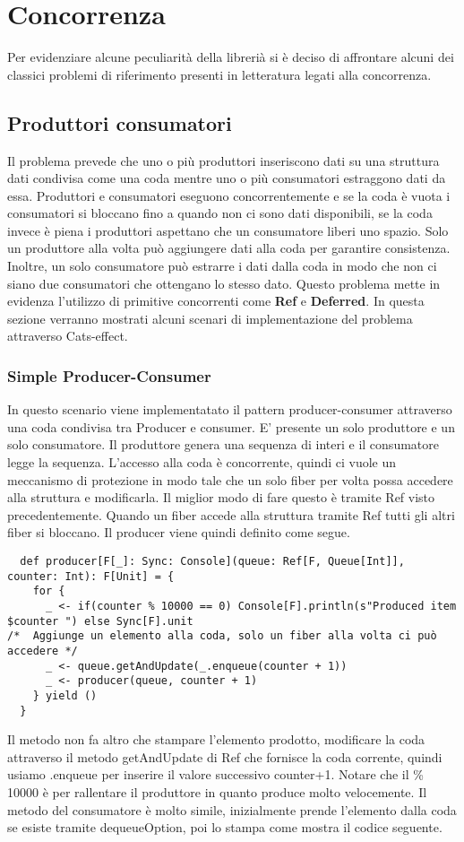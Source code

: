 \section{Concorrenza}
Per evidenziare alcune peculiarità della librerià si è deciso di affrontare alcuni dei classici problemi di riferimento presenti in letteratura legati alla concorrenza. 

\subsection{Produttori consumatori}

Il problema prevede che uno o più produttori inseriscono dati su una struttura dati condivisa come una coda mentre uno o più consumatori estraggono dati da essa. Produttori e consumatori eseguono concorrentemente e se la coda è vuota i 
consumatori si bloccano fino a quando non ci sono dati disponibili, se la coda invece è piena i produttori aspettano che un consumatore liberi uno spazio. Solo un produttore alla volta può aggiungere dati alla coda per garantire consistenza. Inoltre, un solo consumatore può estrarre i dati dalla coda in modo che non ci siano due consumatori che ottengano lo stesso dato. Questo problema mette in evidenza l’utilizzo di primitive concorrenti come \textbf{Ref} e \textbf{Deferred}.
In questa sezione verranno mostrati alcuni scenari di implementazione del problema
attraverso Cats-effect.

\subsubsection{Simple Producer-Consumer}
In questo scenario viene implementatato il pattern producer-consumer attraverso una
coda condivisa tra Producer e consumer. E’ presente un solo produttore e un solo
consumatore. Il produttore genera una sequenza di interi e il consumatore legge la
sequenza. L’accesso alla coda è concorrente, quindi ci vuole un meccanismo di protezione in modo tale che un solo fiber per volta possa accedere alla struttura e modificarla. Il miglior modo di fare questo è tramite Ref visto precedentemente. Quando un fiber accede alla struttura tramite Ref tutti gli altri fiber si bloccano.
Il producer viene quindi definito come segue.

\begin{verbatim}
  def producer[F[_]: Sync: Console](queue: Ref[F, Queue[Int]], counter: Int): F[Unit] = {
    for {
      _ <- if(counter % 10000 == 0) Console[F].println(s"Produced item $counter ") else Sync[F].unit
/*  Aggiunge un elemento alla coda, solo un fiber alla volta ci può accedere */
      _ <- queue.getAndUpdate(_.enqueue(counter + 1)) 
      _ <- producer(queue, counter + 1)
    } yield ()
  }
\end{verbatim}
\noindent Il metodo non fa altro che stampare l’elemento prodotto, modificare la coda attraverso
il metodo getAndUpdate di Ref che fornisce la coda corrente, quindi usiamo .enqueue per inserire il valore successivo counter+1. Notare che il \% 10000 è per rallentare il produttore in quanto produce molto velocemente. Il metodo del consumatore è molto simile, inizialmente prende l’elemento dalla coda se esiste tramite dequeueOption, poi lo stampa come mostra il codice seguente.

